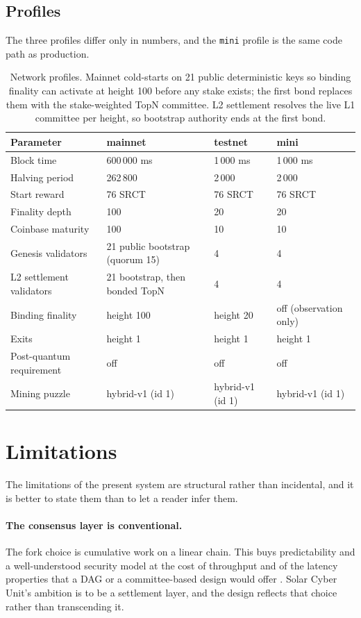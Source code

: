 \documentclass{article}
\begin{document}
\subsection{Profiles}

The three profiles differ only in numbers, and the \texttt{mini} profile is
the same code path as production.

\begin{table}[htbp]
\centering
\begin{tabular}{llll}
\toprule
\textbf{Parameter} & \textbf{mainnet} & \textbf{testnet} & \textbf{mini} \\
\midrule
Block time & 600\,000 ms & 1\,000 ms & 1\,000 ms \\
Halving period & 262\,800 & 2\,000 & 2\,000 \\
Start reward & 76 SRCT & 76 SRCT & 76 SRCT \\
Finality depth & 100 & 20 & 20 \\
Coinbase maturity & 100 & 10 & 10 \\
Genesis validators & 21 public bootstrap (quorum 15) & 4 & 4 \\
L2 settlement validators & 21 bootstrap, then bonded TopN & 4 & 4 \\
Binding finality & height 100 & height 20 & off (observation only) \\
Exits & height 1 & height 1 & height 1 \\
Post-quantum requirement & off & off & off \\
Mining puzzle & hybrid-v1 (id 1) & hybrid-v1 (id 1) & hybrid-v1 (id 1) \\
\bottomrule
\end{tabular}
\caption{Network profiles. Mainnet cold-starts on 21 public deterministic keys so
binding finality can activate at height 100 before any stake exists; the first
bond replaces them with the stake-weighted TopN committee. L2 settlement
resolves the live L1 committee per height, so bootstrap authority ends at the
first bond.}
\label{tab:profiles}
\end{table}


\section{Limitations}
\label{sec:future}

The limitations of the present system are structural rather than incidental,
and it is better to state them than to let a reader infer them.

\paragraph{The consensus layer is conventional.} The fork choice is cumulative
work on a linear chain. This buys predictability and a well-understood security
model at the cost of throughput and of the latency properties that a DAG or a
committee-based design would offer \cite{eyal2014securitybitcoin,trivedi2017sok}.
Solar Cyber Unit's ambition is to be a settlement layer, and the design reflects that
choice rather than transcending it.
\end{document}
